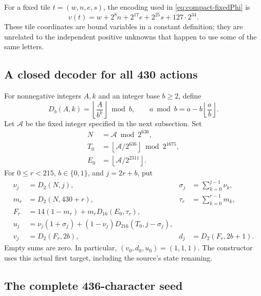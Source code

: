 For a fixed tile \(t=(w,n,e,s)\), the encoding used in
\eqref{eq:compact-fixedPhi} is
\[
 v(t)=w+2^8n+2^{17}e+2^{25}s+127\cdot2^{34}.
\]
These tile coordinates are bound variables in a constant definition;
they are unrelated to the independent positive unknowns that happen to
use some of the same letters.

\subsection{A closed decoder for all 430 actions}

For nonnegative integers \(A,k\) and an integer base \(b\ge2\), define
\[
 D_b(A,k)=\left\lfloor\frac{A}{b^k}\right\rfloor\bmod b,
 \qquad
 a\bmod b=a-b\left\lfloor\frac ab\right\rfloor.
\]
Let \(\mathcal A\) be the fixed integer specified in the next subsection.
Set
\begin{align*}
 N&=\mathcal A\bmod2^{636},\\
 T_0&=\left\lfloor\mathcal A/2^{636}\right\rfloor\bmod2^{1675},\\
 E_0&=\left\lfloor\mathcal A/2^{2311}\right\rfloor.
\end{align*}
For \(0\le r<215\), \(b\in\{0,1\}\), and \(j=2r+b\), put
\begin{align}
 \nu_j&=D_2(N,j),&
 \sigma_j&=\sum_{k=0}^{j-1}\nu_k,\nonumber\\
 m_r&=D_2(N,430+r),&
 \tau_r&=\sum_{k=0}^{r-1}m_k,\nonumber\\
 F_r&=14(1-m_r)+m_rD_{16}(E_0,\tau_r),\nonumber\\
 u_j&=\nu_j(1+\sigma_j)
          +(1-\nu_j)D_{216}(T_0,j-\sigma_j),\nonumber\\
 v_j&=D_2(F_r,2b),&
 d_j&=D_2(F_r,2b+1).                              \label{eq:compact-actiondecoder}
\end{align}
Empty sums are zero.  In particular,
\((v_0,d_0,u_0)=(1,1,1)\).  The constructor uses this actual first
target, including the source's state renaming.

\subsection{The complete 436-character seed}

